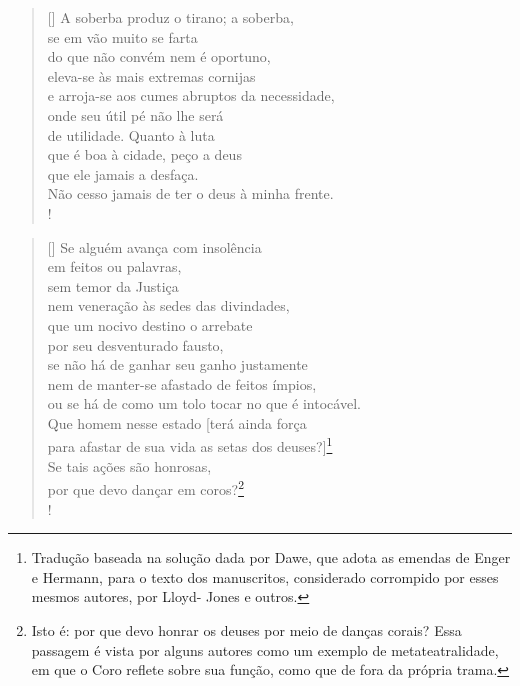 \begin{verse}[\versewidth]
A soberba produz o tirano; a soberba,\\ 
se em vão muito se farta\\
do que não convém nem é oportuno,\\
eleva-se às mais extremas cornijas\\
e arroja-se aos cumes abruptos da necessidade,\\
onde seu útil pé não lhe será\\
de utilidade. Quanto à luta\\
que é boa à cidade, peço a deus\\
que ele jamais a desfaça.\\
Não cesso jamais de ter o deus à minha frente.\\!
\end{verse} 

\settowidth{\versewidth}{brilhante? Tenso, agito-me com medo em meu trêm}
\begin{verse}[\versewidth] 
Se alguém avança com insolência\\ 
em feitos ou palavras,\\
sem temor da Justiça\\
nem veneração às sedes das divindades,\\
que um nocivo destino o arrebate\\
por seu desventurado fausto,\\
se não há de ganhar seu ganho justamente\\
nem de manter-se afastado de feitos ímpios,\\
ou se há de como um tolo tocar no que é intocável.\\
Que homem nesse estado {[}terá ainda força\\
para afastar de sua vida as setas dos deuses?{]}\footnote{Tradução
baseada na solução dada por Dawe, que adota as emendas de Enger e
Hermann, para o texto dos manuscritos, considerado corrompido por
esses mesmos autores, por Lloyd- Jones e outros.}\\
Se tais ações são honrosas,\\
por que devo dançar em coros?\footnote{Isto é: por que devo honrar os
  deuses por meio de danças corais? Essa passagem é vista por alguns
  autores como um exemplo de metateatralidade, em que o Coro reflete
  sobre sua função, como que de fora da própria trama.}\\!
\end{verse} 

